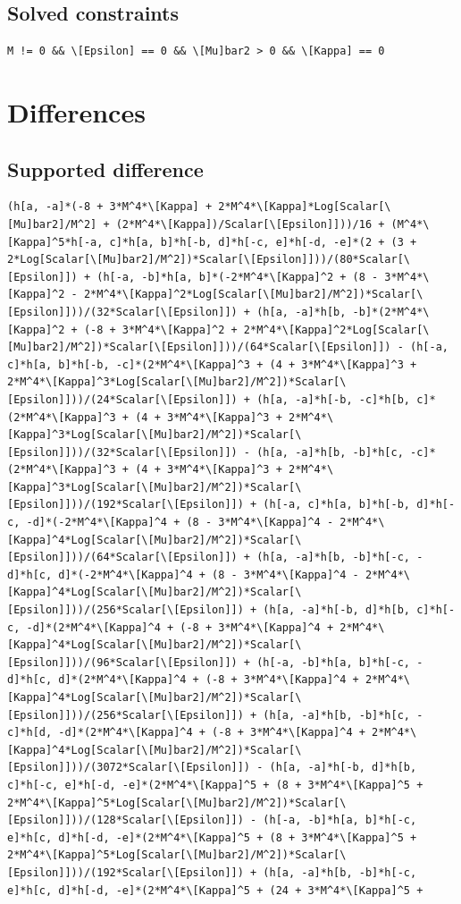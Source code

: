 \documentclass[11pt]{article}
\begin{document}
\subsection{Solved constraints}
\begin{verbatim}
M != 0 && \[Epsilon] == 0 && \[Mu]bar2 > 0 && \[Kappa] == 0
\end{verbatim}
\section{Differences}
\subsection{Supported difference}
\begin{verbatim}
(h[a, -a]*(-8 + 3*M^4*\[Kappa] + 2*M^4*\[Kappa]*Log[Scalar[\[Mu]bar2]/M^2] + (2*M^4*\[Kappa])/Scalar[\[Epsilon]]))/16 + (M^4*\[Kappa]^5*h[-a, c]*h[a, b]*h[-b, d]*h[-c, e]*h[-d, -e]*(2 + (3 + 2*Log[Scalar[\[Mu]bar2]/M^2])*Scalar[\[Epsilon]]))/(80*Scalar[\[Epsilon]]) + (h[-a, -b]*h[a, b]*(-2*M^4*\[Kappa]^2 + (8 - 3*M^4*\[Kappa]^2 - 2*M^4*\[Kappa]^2*Log[Scalar[\[Mu]bar2]/M^2])*Scalar[\[Epsilon]]))/(32*Scalar[\[Epsilon]]) + (h[a, -a]*h[b, -b]*(2*M^4*\[Kappa]^2 + (-8 + 3*M^4*\[Kappa]^2 + 2*M^4*\[Kappa]^2*Log[Scalar[\[Mu]bar2]/M^2])*Scalar[\[Epsilon]]))/(64*Scalar[\[Epsilon]]) - (h[-a, c]*h[a, b]*h[-b, -c]*(2*M^4*\[Kappa]^3 + (4 + 3*M^4*\[Kappa]^3 + 2*M^4*\[Kappa]^3*Log[Scalar[\[Mu]bar2]/M^2])*Scalar[\[Epsilon]]))/(24*Scalar[\[Epsilon]]) + (h[a, -a]*h[-b, -c]*h[b, c]*(2*M^4*\[Kappa]^3 + (4 + 3*M^4*\[Kappa]^3 + 2*M^4*\[Kappa]^3*Log[Scalar[\[Mu]bar2]/M^2])*Scalar[\[Epsilon]]))/(32*Scalar[\[Epsilon]]) - (h[a, -a]*h[b, -b]*h[c, -c]*(2*M^4*\[Kappa]^3 + (4 + 3*M^4*\[Kappa]^3 + 2*M^4*\[Kappa]^3*Log[Scalar[\[Mu]bar2]/M^2])*Scalar[\[Epsilon]]))/(192*Scalar[\[Epsilon]]) + (h[-a, c]*h[a, b]*h[-b, d]*h[-c, -d]*(-2*M^4*\[Kappa]^4 + (8 - 3*M^4*\[Kappa]^4 - 2*M^4*\[Kappa]^4*Log[Scalar[\[Mu]bar2]/M^2])*Scalar[\[Epsilon]]))/(64*Scalar[\[Epsilon]]) + (h[a, -a]*h[b, -b]*h[-c, -d]*h[c, d]*(-2*M^4*\[Kappa]^4 + (8 - 3*M^4*\[Kappa]^4 - 2*M^4*\[Kappa]^4*Log[Scalar[\[Mu]bar2]/M^2])*Scalar[\[Epsilon]]))/(256*Scalar[\[Epsilon]]) + (h[a, -a]*h[-b, d]*h[b, c]*h[-c, -d]*(2*M^4*\[Kappa]^4 + (-8 + 3*M^4*\[Kappa]^4 + 2*M^4*\[Kappa]^4*Log[Scalar[\[Mu]bar2]/M^2])*Scalar[\[Epsilon]]))/(96*Scalar[\[Epsilon]]) + (h[-a, -b]*h[a, b]*h[-c, -d]*h[c, d]*(2*M^4*\[Kappa]^4 + (-8 + 3*M^4*\[Kappa]^4 + 2*M^4*\[Kappa]^4*Log[Scalar[\[Mu]bar2]/M^2])*Scalar[\[Epsilon]]))/(256*Scalar[\[Epsilon]]) + (h[a, -a]*h[b, -b]*h[c, -c]*h[d, -d]*(2*M^4*\[Kappa]^4 + (-8 + 3*M^4*\[Kappa]^4 + 2*M^4*\[Kappa]^4*Log[Scalar[\[Mu]bar2]/M^2])*Scalar[\[Epsilon]]))/(3072*Scalar[\[Epsilon]]) - (h[a, -a]*h[-b, d]*h[b, c]*h[-c, e]*h[-d, -e]*(2*M^4*\[Kappa]^5 + (8 + 3*M^4*\[Kappa]^5 + 2*M^4*\[Kappa]^5*Log[Scalar[\[Mu]bar2]/M^2])*Scalar[\[Epsilon]]))/(128*Scalar[\[Epsilon]]) - (h[-a, -b]*h[a, b]*h[-c, e]*h[c, d]*h[-d, -e]*(2*M^4*\[Kappa]^5 + (8 + 3*M^4*\[Kappa]^5 + 2*M^4*\[Kappa]^5*Log[Scalar[\[Mu]bar2]/M^2])*Scalar[\[Epsilon]]))/(192*Scalar[\[Epsilon]]) + (h[a, -a]*h[b, -b]*h[-c, e]*h[c, d]*h[-d, -e]*(2*M^4*\[Kappa]^5 + (24 + 3*M^4*\[Kappa]^5 + 
\end{verbatim}
\end{document}
